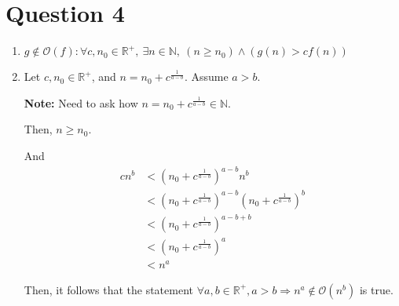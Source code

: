 \documentclass[12pt]{article}
\begin{document}
\section*{Question 4}
\begin{enumerate}
    \item

    $g \notin \mathcal{O}(f): \forall c,n_0 \in \mathbb{R}^{+},\:\exists n \in \mathbb{N},\:(
    n \geq n_0) \land (g(n) > cf(n))$

    \item

    Let $c,n_0 \in \mathbb{R}^{+}$, and $n = n_0 + c^{\frac{1}{a-b}}$. Assume $a > b$.

    \bigskip

    \textbf{Note:} Need to ask how $n = n_0 + c^{\frac{1}{a-b}} \in \mathbb{N}$.

    \bigskip

    Then, $n \geq n_0$.

    \bigskip

    And
    \setcounter{equation}{0}
    \begin{align}
        cn^b &< (n_0 + c^{\frac{1}{a-b}})^{a-b}n^b\\
        &< (n_0 + c^{\frac{1}{a-b}})^{a-b}(n_0 + c^{\frac{1}{a-b}})^b\\
        &< (n_0 + c^{\frac{1}{a-b}})^{a-b+b}\\
        &< (n_0 + c^{\frac{1}{a-b}})^a\\
        &< n^a
    \end{align}

    Then, it follows that the statement $\forall a,b \in
    \mathbb{R}^{+}, a > b \Rightarrow n^a \notin \mathcal{O}(n^b)$ is true.

\end{enumerate}
\end{document}
